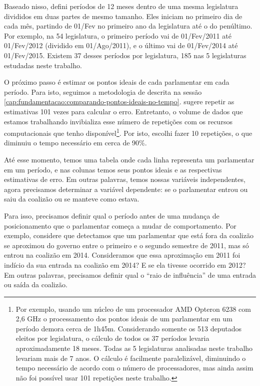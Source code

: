 \documentclass[a4paper,titlepage]{ppgi}\usepackage[]{graphicx}\usepackage[]{color}
\begin{document}
Baseado nisso, defini períodos de 12 meses dentro de uma mesma legislatura
divididos em duas partes de mesmo tamanho. Eles iniciam no primeiro dia de cada
mês, partindo de 01/Fev no primeiro ano da legislatura até o do penúltimo. Por
exemplo, na 54\textordfeminine{} legislatura, o primeiro período vai de
01/Fev/2011 até 01/Fev/2012 (dividido em 01/Ago/2011), e o último vai de
01/Fev/2014 até 01/Fev/2015. Existem 37 desses períodos por legislatura, 185
nas 5 legislaturas estudadas neste trabalho.

O próximo passo é estimar os pontos ideais de cada parlamentar em cada período.
Para isto, seguimos a metodologia de  descrita na sessão
\ref{cap:fundamentacao:comparando-pontos-ideais-no-tempo}.
\citeauthor{Poole2005} sugere repetir as estimativas 101 vezes para calcular o
erro. Entretanto, o volume de dados que estamos trabalhando invibializa esse
número de repetições com os recursos computacionais que tenho
disponível\footnote{Por exemplo, usando um núcleo de um processador AMD
Opteron\texttrademark{} 6238 com 2,6 GHz o processamento dos pontos ideais de
um parlamentar em um período demora cerca de 1h45m. Considerando somente os 513
deputados eleitos por legislatura, o cálculo de todos os 37 períodos levaria
aproximadamente 18 meses. Todas as 5 legislaturas analisadas neste trabalho
levariam mais de 7 anos. O cálculo é facilmente paralelizável, diminuindo o
tempo necessário de acordo com o número de processadores, mas ainda assim não
foi possível usar 101 repetições neste trabalho.}. Por isto, escolhi fazer 10
repetições, o que diminuiu o tempo necessário em cerca de 90\%.

Até esse momento, temos uma tabela onde cada linha representa um parlamentar em
um período, e nas colunas temos seus pontos ideais e as respectivas estimativas
de erro. Em outras palavras, temos nossas variáveis independentes, agora
precisamos determinar a variável dependente: se o parlamentar entrou ou saiu da
coalizão ou se manteve como estava.

Para isso, precisamos definir qual o período antes de uma mudança de
posicionamento que o parlamentar começa a mudar de comportamento. Por exemplo,
considere que detectamos que um parlamentar que está fora da coalizão se
aproximou do governo entre o primeiro e o segundo semestre de 2011, mas só
entrou na coalizão em 2014. Consideramos que essa aproximação em 2011 foi
indício da sua entrada na coalizão em 2014? E se ela tivesse ocorrido em 2012?
Em outras palavras, precisamos definir qual o ``raio de influência'' de uma
entrada ou saída da coalizão.
\end{document}
